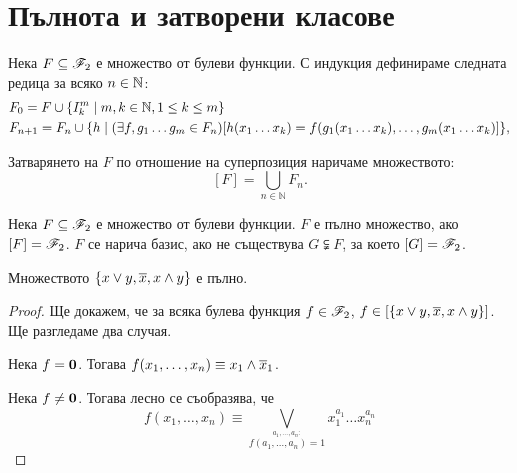 \section{Пълнота и затворени класове}

\begin{dfn}
Нека $F\subseteq \mathscr{F}_2$ е множество от булеви функции. С
индукция дефинираме следната редица за всяко $n \in \mathbb{N}$:
\begin{align*}
  & F_0 = F\cup \{I^m_k \mid m,k\in\mathbb{N}, 1\leq k\leq m\}\\
  & F_{n+1} = F_n \cup \{h \mid (\exists f, g_1\dots g_m \in F_n)[h(x_1\dots x_k) =  f(g_1(x_1\dots x_k), \dots, g_m(x_1\dots x_k)]\},
\end{align*}

Затварянето на $F$ по отношение на суперпозиция наричаме
множеството:
\[[F] = \bigcup_{n\in \mathbb{N}}F_n.\]

\end{dfn}



\begin{dfn}
  Нека $F\subseteq \mathscr{F}_2$ е множество от булеви функции. 
  $F$ е пълно множество, ако $[F] = \mathscr{F}_2$.
  $F$ се нарича базис, ако не съществува $G \subsetneqq F$, за което $[G] = \mathscr{F}_2$.
\end{dfn}

\begin{thm}[Бул]
  Множеството $\{x\vee y,\overline{x},x\wedge y\}$ е пълно.
\end{thm}
\begin{proof}
  Ще докажем, че за всяка булева функция $f \in \mathscr{F}_2$, $f \in [\{x\vee y, \overline{x}, x \wedge y\}]$.
  Ще разгледаме два случая.
  
  Нека $f = \bf{0}$. Тогава $f(x_1,\dots,x_n) \equiv x_1\wedge\overline{x}_1$.
  
  Нека $f \neq \bf{0}$. Тогава лесно се съобразява, че
  \[f(x_1,\dots,x_n) \equiv \bigvee_{\stackrel{a_1,\dots,a_n:}{f(a_1,\dots,a_n) = 1}} x^{a_1}_1\dots x^{a_n}_n\]
\end{proof}



